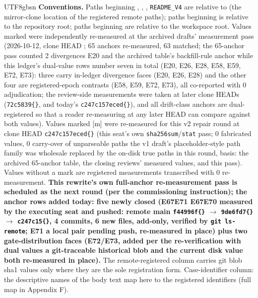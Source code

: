\documentclass[11pt,letterpaper]{article}
\begin{document}
\begin{CJK}{UTF8}{gbsn}
\textbf{Conventions.} Paths beginning , , , \texttt{README\_V4} are relative to  (the mirror-clone location of the registered remote paths); paths beginning  is relative to the repository root; paths beginning  are relative to the workspace root. Values marked  were independently re-measured at the archived drafts' measurement pass (2026-10-12, clone HEAD ; 65 anchors re-measured, 63 matched; the 65-anchor pass counted 2 divergences \textemdash{} E20 and the archived table's backfill-rule anchor \textemdash{} while this ledger's dual-value rows number seven in total (E20, E26, E28, E58, E59, E72, E73): three carry in-ledger divergence faces (E20, E26, E28) and the other four are registered-epoch contrasts (E58, E59, E72, E73), all co-reported with 0 adjudication; the review-side measurements were taken at later clone HEADs (\texttt{72c5839\textellipsis\{\}}, and today's \texttt{c247c157eced\textellipsis\{\}}), and all drift-class anchors are dual-registered so that a reader re-measuring at any later HEAD can compare against both values). Values marked [m] were re-measured for this v2 repair round at clone HEAD \texttt{c247c157eced\textellipsis\{\}} (this seat's own \texttt{sha256sum}/\texttt{stat} pass; 0 fabricated values, 0 carry-over of unparseable paths \textemdash{} the v1 draft's placeholder-style path family was wholesale replaced by the on-disk true paths in this round, basis: the archived 65-anchor table, the closing reviews' measured values, and this pass). Values without a mark are registered measurements transcribed with 0 re-measurement. \textbf{This rewrite's own full-anchor re-measurement pass is scheduled as the next round (per the commissioning instruction); the anchor rows added today: five newly closed (E67\textendash{}E71 \textemdash{} E67\textendash{}E70 measured by the executing seat and pushed: remote main \texttt{f44996f\textellipsis\{\}} \ensuremath{\to} \texttt{9de6fd7\textellipsis\{\}} \ensuremath{\to} \texttt{c247c15\textellipsis\{\}}, 4 commits, 6 new files, add-only, verified by \texttt{git ls-remote}; E71 a local pair pending push, re-measured in place) plus two gate-distribution faces (E72/E73, added per the re-verification with dual values \textemdash{} a git-traceable historical blob and the current disk value \textemdash{} both re-measured in place).} The remote-registered column carries git blob sha1 values only where they are the sole registration form. Case-identifier column: the descriptive names of the body text map here to the registered identifiers (full map in Appendix F).


\end{CJK}
\end{document}
